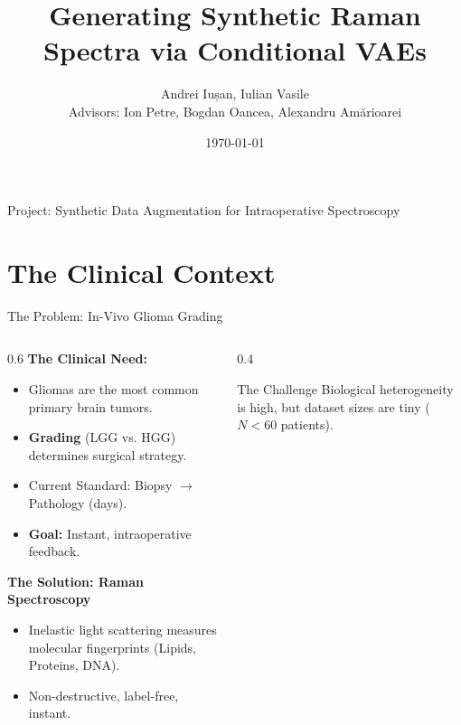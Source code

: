 \documentclass[aspectratio=169, 10pt]{beamer}
\title{Generating Synthetic Raman Spectra via Conditional VAEs}
\author[Andrei Iușan, Iulian Vasile]{Andrei Iușan, Iulian Vasile \texorpdfstring{\\}{ } \scriptsize{Advisors: Ion Petre, Bogdan Oancea, Alexandru Amărioarei}}
\institute[INCDSB]{National Institute of Research and Development in Biological Sciences}
\date{\today}
\begin{document}
\begin{frame}
    \titlepage
    \begin{center}
        \scriptsize{Project: Synthetic Data Augmentation for Intraoperative Spectroscopy}
    \end{center}
\end{frame}

\section{The Clinical Context}

\begin{frame}{The Problem: In-Vivo Glioma Grading}
    \begin{columns}
        \begin{column}{0.6\textwidth}
            \textbf{The Clinical Need:}
            \begin{itemize}
                \item Gliomas are the most common primary brain tumors.
                \item \textbf{Grading} (LGG vs. HGG) determines surgical strategy.
                \item Current Standard: Biopsy $\to$ Pathology (days).
                \item \textbf{Goal:} Instant, intraoperative feedback.
            \end{itemize}
            
            \vspace{1em}
            \textbf{The Solution: Raman Spectroscopy}
            \begin{itemize}
                \item Inelastic light scattering measures molecular fingerprints (Lipids, Proteins, DNA).
                \item Non-destructive, label-free, instant.
            \end{itemize}
        \end{column}
        \begin{column}{0.4\textwidth}
            \begin{alertblock}{The Challenge}
                Biological heterogeneity is high, but dataset sizes are tiny ($N < 60$ patients).
            \end{alertblock}
        \end{column}
    \end{columns}
\end{frame}
\end{document}
